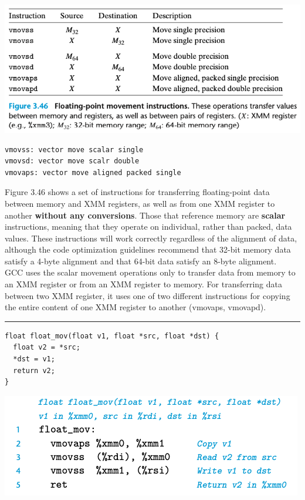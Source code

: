 \documentclass[11pt]{article}
\begin{document}
\begin{center}
\includegraphics[width=.9\linewidth]{pics/floating-point-movement-instructions.png}
\end{center}

\begin{verbatim}
vmovss: vector move scalar single
vmovsd: vector move scalr double
vmovaps: vector move aligned packed single
\end{verbatim}

Figure 3.46 shows a set of instructions for transferring floating-point data between memory and XMM registers, as well as from one XMM register to another \textbf{without any conversions}. Those that reference memory are \textbf{scalar} instructions, meaning that they operate on individual, rather than packed, data values. These instructions will work correctly regardless of the alignment of data, although the code optimization guidelines recommend that 32-bit memory data satisfy a 4-byte alignment and that 64-bit data satisfy an 8-byte alignment.\\

GCC uses the scalar movement operations only to transfer data from memory to an XMM register or from an XMM register to memory. For transferring data between two XMM register, it uses one of two different instructions for copying the entire content of one XMM register to another (vmovaps, vmovapd).\\

\noindent\rule{\textwidth}{0.5pt}
\begin{verbatim}
float float_mov(float v1, float *src, float *dst) {
  float v2 = *src;
  *dst = v1;
  return v2;
}

\end{verbatim}

\begin{center}
\includegraphics[width=.9\linewidth]{pics/float_mov-assembly-code.png}
\end{center}
\end{document}
